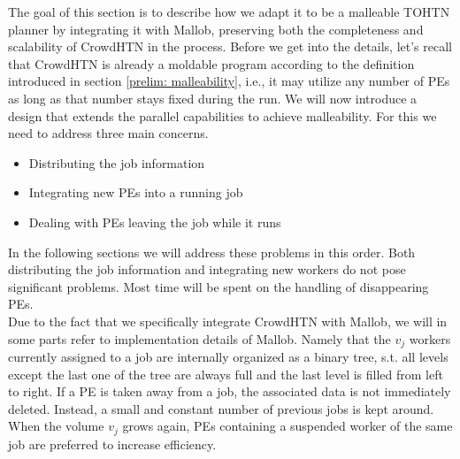 The goal of this section is to describe how we adapt it to be a malleable TOHTN planner by integrating it with Mallob, preserving both the completeness and scalability of CrowdHTN in the process. Before we get into the details, let's recall that CrowdHTN is already a moldable program according to the definition introduced in section \ref{prelim: malleability}, i.e., it may utilize any number of PEs as long as that number stays fixed during the run. We will now introduce a design that extends the parallel capabilities to achieve malleability. For this we need to address three main concerns.
\begin{itemize}
	\item Distributing the job information
	\item Integrating new PEs into a running job
	\item Dealing with PEs leaving the job while it runs
\end{itemize}
In the following sections we will address these problems in this order. Both distributing the job information and integrating new workers do not pose significant problems. Most time will be spent on the handling of disappearing PEs.\\
Due to the fact that we specifically integrate CrowdHTN with Mallob, we will in some parts refer to implementation details of Mallob. Namely that the $v_j$ workers currently assigned to a job are internally organized as a binary tree, s.t. all levels except the last one of the tree are always full and the last level is filled from left to right. If a PE is taken away from a job, the associated data is not immediately deleted. Instead, a small and constant number of previous jobs is kept around. When the volume $v_j$ grows again, PEs containing a suspended worker of the same job are preferred to increase efficiency. \\

